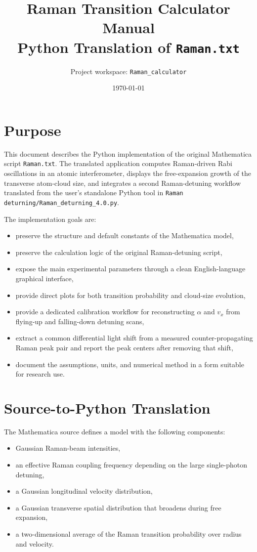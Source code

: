 \documentclass[11pt,a4paper]{article}
\title{Raman Transition Calculator Manual\\\large Python Translation of \texttt{Raman.txt}}
\author{Project workspace: \texttt{Raman\_calculator}}
\date{\today}
\begin{document}
\maketitle
\tableofcontents

\section{Purpose}

This document describes the Python implementation of the original Mathematica script
\texttt{Raman.txt}. The translated application computes Raman-driven Rabi oscillations in an
atomic interferometer, displays the free-expansion growth of the transverse atom-cloud size, and
integrates a second Raman-detuning workflow translated from the user's standalone Python tool in
\texttt{Raman deturning/Raman\_deturning\_4.0.py}.

The implementation goals are:

\begin{itemize}
  \item preserve the structure and default constants of the Mathematica model,
  \item preserve the calculation logic of the original Raman-detuning script,
  \item expose the main experimental parameters through a clean English-language graphical interface,
  \item provide direct plots for both transition probability and cloud-size evolution,
  \item provide a dedicated calibration workflow for reconstructing $\alpha$ and $v_x$ from
  flying-up and falling-down detuning scans,
  \item extract a common differential light shift from a measured counter-propagating Raman
  peak pair and report the peak centers after removing that shift,
  \item document the assumptions, units, and numerical method in a form suitable for research use.
\end{itemize}

\section{Source-to-Python Translation}

The Mathematica source defines a model with the following components:

\begin{itemize}
  \item Gaussian Raman-beam intensities,
  \item an effective Raman coupling frequency depending on the large single-photon detuning,
  \item a Gaussian longitudinal velocity distribution,
  \item a Gaussian transverse spatial distribution that broadens during free expansion,
  \item a two-dimensional average of the Raman transition probability over radius and velocity.
\end{itemize}
\end{document}
